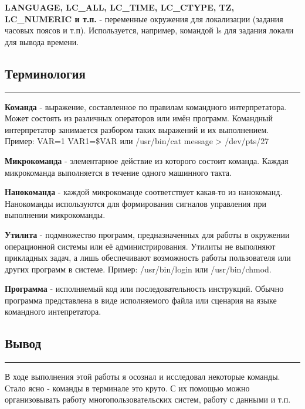\documentclass[12pt, a4paper]{article}
\begin{document}
\textbf{LANGUAGE, LC\_ALL, LC\_TIME, LC\_CTYPE, TZ, LC\_NUMERIC и т.п.} - 
переменные окружения для локализации (задания часовых поясов и т.п).
Используется, например, командой ls для задания локали для вывода времени.

\subsection{Терминология}
\par\noindent\rule{\textwidth}{0.4pt}
\textbf{Команда} - выражение, составленное по правилам командного интерпретатора.
Может состоять из различных операторов или имён программ. Командный интерпретатор
занимается разбором таких выражений и их выполнением. Пример: VAR=1 VAR1=\$VAR
или /usr/bin/cat message > /dev/pts/27

\textbf{Микрокоманда} - элементарное действие из которого состоит команда.
Каждая микрокоманда выполняется в течение одного машинного такта.

\textbf{Нанокоманда} - каждой микрокоманде соответствует какая-то из нанокоманд.
Нанокоманды используются для формирования сигналов управления при выполнении микрокоманды.

\textbf{Утилита} - подмножество программ, предназначенных для работы в окружении
операционной системы или её администрирования. Утилиты не выполняют прикладных
задач, а лишь обеспечивают возможность работы пользователя или других программ
в системе. Пример: /usr/bin/login или /usr/bin/chmod.

\textbf{Программа} - исполняемый код или последовательность инструкций. Обычно
программа представлена в виде исполняемого файла или сценария на языке командного
интепретатора.

\subsection{Вывод}
\par\noindent\rule{\textwidth}{0.4pt}
В ходе выполнения этой работы я осознал и исследовал некоторые команды.
Стало ясно - команды в терминале это круто. С их помощью можно организовывать
работу многопользовательских систем, работу с данными и т.п.
\end{document}
